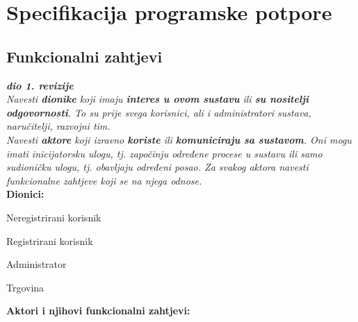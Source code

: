 \chapter{Specifikacija programske potpore}
		
	\section{Funkcionalni zahtjevi}
			
			\textbf{\textit{dio 1. revizije}}\\
			
			\textit{Navesti \textbf{dionike} koji imaju \textbf{interes u ovom sustavu} ili  \textbf{su nositelji odgovornosti}. To su prije svega korisnici, ali i administratori sustava, naručitelji, razvojni tim.}\\
				
			\textit{Navesti \textbf{aktore} koji izravno \textbf{koriste} ili \textbf{komuniciraju sa sustavom}. Oni mogu imati inicijatorsku ulogu, tj. započinju određene procese u sustavu ili samo sudioničku ulogu, tj. obavljaju određeni posao. Za svakog aktora navesti funkcionalne zahtjeve koji se na njega odnose.}\\
			
			
			\noindent \textbf{Dionici:}
			 
			\begin{packed_enum}
				
				\item Neregistrirani korisnik
				\item Registrirani korisnik				
				\item Administrator
                \item Trgovina\\
				
			\end{packed_enum}
   
			
			\noindent \textbf{Aktori i njihovi funkcionalni zahtjevi:}
			
